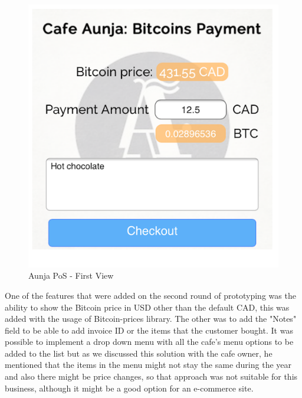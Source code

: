 \begin{figure}[htb!p]
\centering
\includegraphics[scale=0.5]{fig/First_View.png}
  \caption{Aunja PoS - First View}
\label{fig:First_View}
\end{figure}

One of the features that were added on the second round of prototyping was the ability to show the Bitcoin price in USD other than the default CAD, this was added with the usage of Bitcoin-prices library. The other was to add the "Notes" field to be able to add invoice ID or the items that the customer bought. It was possible to implement a drop down menu with all the cafe's menu options to be added to the list but as we discussed this solution with the cafe owner, he mentioned that the items in the menu might not stay the same during the year and also there might be price changes, so that approach was not suitable for this business, although it might be a good option for an e-commerce site.

